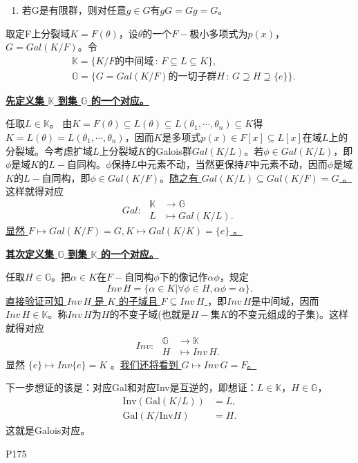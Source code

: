 {\begin{enumerate}
		\item 若G是有限群，则对任意$g\in G$有$gG=Gg=G$。
	\end{enumerate}
	取定F上分裂域$K=F(\theta)$，设$\theta$的一个$F-$极小多项式为$p(x)$，$G=Gal(K/F)$。令
	\begin{equation*}
		\begin{aligned}
			&\mathbb{K}=\{K/F\text{的中间域}\,:\, F\subseteq L\subseteq K \} ,\\
			&\mathbb{G}=\{G=Gal(K/F)\text{的一切子群}H\, :\, G\supseteq H\supseteq\{e\}\}.
		\end{aligned}
	\end{equation*}
	\par
	\textbf{\uline{先定义集 $\mathbb{K}$ 到集 $\mathbb{G}$ 的一个对应。}}
	\par
	任取$L\in \mathbb{K}$。
	由$K=F(\theta)\subseteq L(\theta) \subseteq L(\theta_{1},\cdots,\theta_{n}) \subseteq K$得$K=L(\theta)=L(\theta_{1},\cdots,\theta_{n})$，因而$K$是多项式$p(x)\in F[x]\subseteq L[x]$在域$L$上的分裂域。今考虑扩域$L$上分裂域$K$的Galois群$Gal(K/L)$。若$\phi\in Gal(K/L) $，即$\phi $是域$K$的$L-$自同构。$\phi$保持$L$中元素不动，当然更保持$F$中元素不动，因而$\phi$是域$K$的$L-$自同构，即$\phi\in Gal(K/F) $。\uline{随之有 $Gal(K/L)\subseteq Gal(K/F)=G $ 。}这样就得对应
	\begin{equation*}
		Gal:\,\,
		\begin{aligned}
			\mathbb{K}&\rightarrow\mathbb{G}\\
			L&\mapsto Gal(K/L).
		\end{aligned}
	\end{equation*}
	\uline{显然 $F\mapsto Gal(K/F)=G,K\mapsto Gal(K/K)=\{e\}$ 。}
	\par
	\textbf{\uline{其次定义集 $\mathbb{G}$ 到集 $\mathbb{K}$ 的一个对应。}}
	\par
	任取$H\in \mathbb{G}$。把$\alpha\in K $在$F-$自同构$\phi $下的像记作$\alpha\phi $，规定
	\begin{equation*}
		Inv\, H=\{\alpha\in K|\forall\phi\in H,\alpha\phi=\alpha\}.
	\end{equation*}
	\uline{直接验证可知 $Inv\,H$  是 $K$ 的子域且 $F\subseteq Inv\,H$ }，即$Inv\, H$是中间域，因而$Inv\, H\in \mathbb{K}$。称$Inv \, H $为$H$的不变子域(也就是$H-$集$K$的不变元组成的子集)。这样就得对应
	\begin{equation*}
		Inv:\,\,
		\begin{aligned}
			\mathbb{G}&\rightarrow\mathbb{K}\\
			H&\mapsto Inv\,H.
		\end{aligned}
	\end{equation*}
	显然 $\{e\}\mapsto Inv\{e\}=K$ 。\uline{我们还将看到 $G\mapsto Inv\, G=F$。}
	\par
	下一步想证的该是：对应Gal和对应Inv是互逆的，即想证：$L\in \mathbb{K}$，$H\in \mathbb{G}$，
	\begin{equation*}
		\begin{aligned}
			\text{Inv}(\text{Gal}(K/L))&=L,\\
			\text{Gal}(K/\text{Inv}H)&=H.
		\end{aligned}
	\end{equation*}
	这就是Galois对应。
}
{P175}

